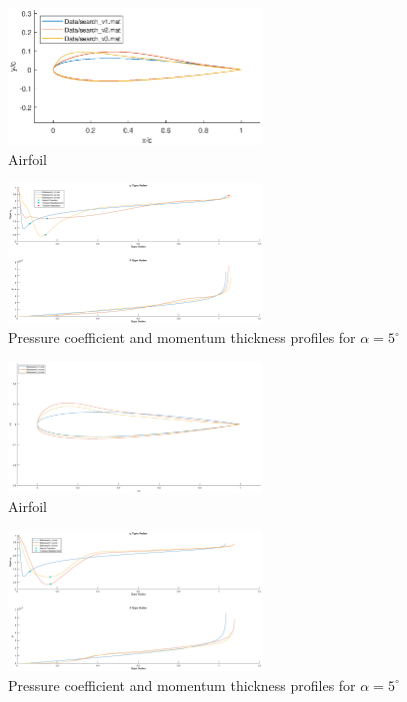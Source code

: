 \documentclass{article}
\begin{document}
\begin{figure}[H]
    \centering
    \includegraphics[width=0.6\textwidth]{figures/hiRe_geometry_3.eps}
    \caption{Airfoil}
    \label{fig:airfoil}
\end{figure}
\begin{figure}[H]
    \centering
    \includegraphics[width=0.6\textwidth]{figures/hiRe_upperprofile_3_a5.eps}
    \caption{Pressure coefficient and momentum thickness profiles for $\alpha = 5^\circ$}
    \label{fig:airfoil}
\end{figure}
\begin{figure}[H]
    \centering
    \includegraphics[width=0.6\textwidth]{figures/hiRe_geometry_5.eps}
    \caption{Airfoil}
    \label{fig:airfoil}
\end{figure}
\begin{figure}[H]
    \centering
    \includegraphics[width=0.6\textwidth]{figures/hiRe_upperprofile_5_a5.eps}
    \caption{Pressure coefficient and momentum thickness profiles for $\alpha = 5^\circ$}
    \label{fig:airfoil}
\end{figure}
\end{document}
